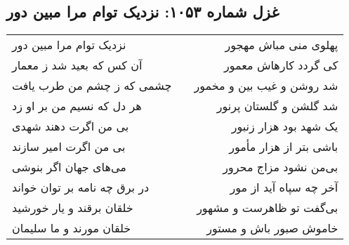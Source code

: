\begin{center}
\section*{غزل شماره ۱۰۵۳: نزدیک توام مرا مبین دور}
\label{sec:1053}
\begin{longtable}{l p{0.5cm} r}
نزدیک توام مرا مبین دور
&&
پهلوی منی مباش مهجور
\\
آن کس که بعید شد ز معمار
&&
کی گردد کارهاش معمور
\\
چشمی که ز چشم من طرب یافت
&&
شد روشن و غیب بین و مخمور
\\
هر دل که نسیم من بر او زد
&&
شد گلشن و گلستان پرنور
\\
بی من اگرت دهند شهدی
&&
یک شهد بود هزار زنبور
\\
بی من اگرت امیر سازند
&&
باشی بتر از هزار مأمور
\\
می‌های جهان اگر بنوشی
&&
بی‌من نشود مزاج محرور
\\
در برق چه نامه بر توان خواند
&&
آخر چه سپاه آید از مور
\\
خلقان برقند و یار خورشید
&&
بی‌گفت تو ظاهرست و مشهور
\\
خلقان مورند و ما سلیمان
&&
خاموش صبور باش و مستور
\\
\end{longtable}
\end{center}
